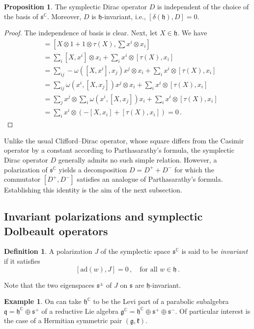 \documentclass{amsart}[draft,11pt]
\newcommand{\mh}{\mathfrak{h}}
\newcommand{\ms}{\mathfrak{s}}
\newcommand{\fg}{{\mathfrak{g}}}
\newcommand{\fk}{{\mathfrak{k}}}
\numberwithin{equation}{section}
\theoremstyle{definition}
\newtheorem{definition}[theorem]{Definition}
\newtheorem{proposition}[theorem]{Proposition}
\newtheorem{example}[theorem]{Example}
\begin{document}
\begin{proposition}
The symplectic Dirac operator $D$ is independent of the choice of the basis of $\ms^\mathbb{C}$.  Moreover, $D$ is $\mh$-invariant, i.e., $[\delta(\mh),D]=0$.
\end{proposition}
\begin{proof}
The independence of basis is clear. Next, let $X\in \mh$. We have 
\begin{align*}
    [\delta(X), D]
    &= [X\otimes 1 + 1\otimes \tau(X), \sum x^i \otimes x_i] \\
    &= \sum_i [X,x^i]\otimes x_i + \sum_i x^i \otimes [\tau(X),x_i] \\
    &= \sum_{ij} -\omega ([X,x^i],x_j)x^j \otimes x_i+ \sum_i x^i \otimes [\tau(X),x_i] \\
    &=\sum_{ij} \omega (x^i,[X,x_j])x^j \otimes x_i+ \sum_i x^i \otimes [\tau(X),x_i] \\
    &=\sum_{j}  x^j\otimes \sum_i \omega (x^i,[X,x_j])x_i + \sum_i x^i \otimes [\tau(X),x_i] \\
    &= \sum_i x^i \otimes 
    (-[X,x_i]+[\tau(X),x_i]) = 0\,.
\end{align*}
\end{proof}
Unlike the usual Clifford–Dirac operator, whose square differs from the Casimir operator by a constant according to Parthasarathy’s formula, the symplectic Dirac operator $D$ generally admits no such simple relation. However, a polarization of $\mathfrak{s}^{\mathbb C}$ yields a decomposition $D=D^++D^-$ for which the commutator $[D^+,D^-]$ satisfies an analogue of Parthasarathy’s formula. Establishing this identity is the aim of the next subsection.

\subsection{Invariant polarizations and symplectic Dolbeault operators}
\begin{definition}
\label{invpol}
A polarization $J$ of the symplectic space $\ms^{\mathbb C}$ is said to be \emph{invariant}
if it satisfies
$$ [\mathrm{ad}(w),J]=0 \,,\quad \text{for all }w\in \mh\,.$$

\end{definition}
Note that the two eigenspaces $\mathfrak{s}^\pm$ of $J$ on $\ms$ are $\mathfrak{h}$-invariant.
\begin{example}\label{parabolic}
On can take
$\mh^\mathbb{C}$ to be the Levi part of a parabolic subalgebra $\mathfrak{q}= \mh^\mathbb{C} \oplus
\ms^+$ of a reductive Lie algebra $\mathfrak{g}^\mathbb{C}=\mathfrak{h}^\mathbb{C}\oplus \ms^+\oplus \ms^-$.
Of particular interest is the case of a Hermitian symmetric pair
$(\fg,\fk)$.
\end{example}
\end{document}
